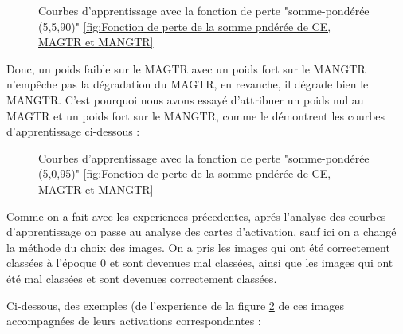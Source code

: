 \documentclass{report}
\begin{document}
{    \begin{figure}[htbp] 
	\centering
	\caption{Courbes d'apprentissage avec la fonction de perte "somme-pondérée (5,5,90)" \ref{fig:Fonction de perte de la somme pndérée de CE, MAGTR et MANGTR}}
	\label{fig:Courbes d'apprentissage de l'expérience "somme-pondérée mangtr5595"}
    \end{figure}
\newpage
\hspace{1.6cm}Donc, un poids faible sur le MAGTR avec un poids fort sur le MANGTR n'empêche pas la dégradation du MAGTR, en revanche, il dégrade bien le MANGTR. C'est pourquoi nous avons essayé d'attribuer un poids nul au MAGTR et un poids fort sur le MANGTR, comme le démontrent les courbes d'apprentissage ci-dessous :
\vspace*{1\baselineskip}

    \begin{figure}[htbp] 
	\centering
	\caption{Courbes d'apprentissage avec la fonction de perte "somme-pondérée (5,0,95)" \ref{fig:Fonction de perte de la somme pndérée de CE, MAGTR et MANGTR}}
	\label{fig:Courbes d'apprentissage de l'expérience "somme-pondérée mangtr5095"}
    \end{figure}



\hspace{1.6cm}Comme on a fait avec les experiences précedentes, aprés l'analyse des courbes d'apprentissage on passe au analyse des cartes d'activation, sauf ici on a changé la méthode du choix des images. On a pris les images qui ont été correctement classées à l'époque 0 et sont devenues mal classées, ainsi que les images qui ont été mal classées et sont devenues correctement classées. 
\vspace*{1\baselineskip}

\hspace{1.6cm}Ci-dessous, des exemples (de l'experience de la figure \ref{fig:Courbes d'apprentissage de l'expérience "somme-pondérée mangtr5095"} de ces images accompagnées de leurs activations correspondantes :
\newpage

}
\end{document}
